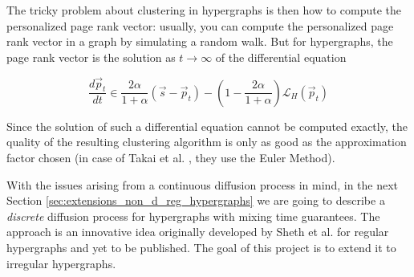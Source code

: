 \documentclass[../main.tex]{subfiles}
\begin{document}
	The tricky problem about clustering in hypergraphs is then how to compute the personalized page rank vector: usually, you can compute the personalized page rank vector in a graph by simulating a random walk. But for hypergraphs, the page rank vector is the solution as $t\to\infty$ of the differential equation
	
	\begin{equation}
		\frac{d\vec{p}_t}{dt} \in \frac{2\alpha}{1+\alpha}(\vec{s} - \vec{p}_t) - \left(1 - \frac{2\alpha}{1+\alpha}\right)\mathcal{L}_H(\vec{p}_t)
	\end{equation}

	Since the solution of such a differential equation cannot be computed exactly, the quality of the resulting clustering algorithm is only as good as the approximation factor chosen (in case of Takai et al. \cite{Takai_2020}, they use the Euler Method). 
	
	With the issues arising from a continuous diffusion process in mind, in the next Section \ref{sec:extensions_non_d_reg_hypergraphs} we are going to describe a \textit{discrete } diffusion process for hypergraphs with mixing time guarantees. The approach is an innovative idea originally developed by Sheth et al. for regular hypergraphs and yet to be published. The goal of this project is to extend it to irregular hypergraphs.
	
\end{document}
